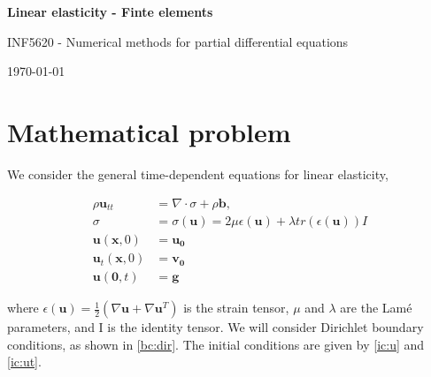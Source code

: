 \documentclass[twoside]{article}
\begin{document}






\begin{center}
{\LARGE\bf Linear elasticity - Finte elements}
\end{center}


\vspace{0.5cm}
\begin{center}
\centerline{INF5620 - Numerical methods for partial differential equations}
\end{center}





\begin{center}
\today
\end{center}

\vspace{1cm}


\section{Mathematical problem}
We consider the general time-dependent equations for linear elasticity,

\begin{align}
\rho \mathbf{u}_{tt} &= \nabla\cdot\sigma + \rho \mathbf{b},     \label{eq:lin:elast}\\
\sigma &= \sigma(\mathbf{u}) = 2\mu\epsilon(\mathbf{u}) + \lambda tr(\epsilon(\mathbf{u}))I     \label{sigma}\\
\mathbf{u}(\mathbf{x}, 0) &= \mathbf{u_0}       \label{ic:u}\\
\mathbf{u}_t(\mathbf{x},0) &= \mathbf{v_0}     \label{ic:ut}\\
\mathbf{u}(\mathbf{0}, t) &= \mathbf{g}        \label{bc:dir}
\end{align}

where $\epsilon(\mathbf{u}) = \frac{1}{2}\left(\nabla \mathbf{u} + \nabla \mathbf{u}^T\right)$ is the strain tensor, $\mu$ and $\lambda$ are the Lam\'e parameters, and I is the identity tensor. We will consider Dirichlet boundary conditions, as shown in \eqref{bc:dir}. The initial conditions are given by \eqref{ic:u} and \eqref{ic:ut}.
\end{document}
